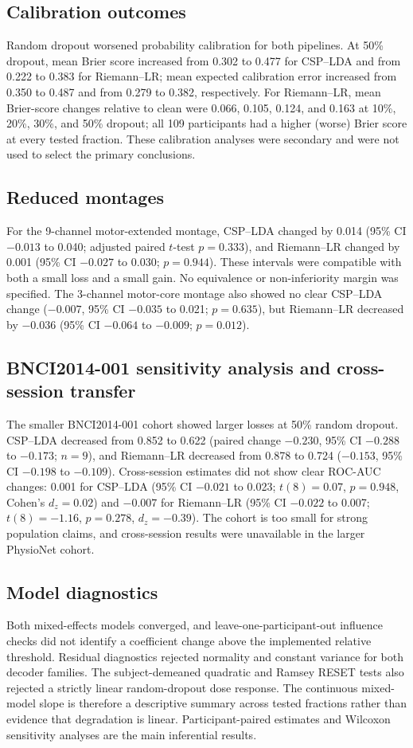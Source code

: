 \documentclass[11pt]{article}
\begin{document}
\subsection{Calibration outcomes}
Random dropout worsened probability calibration for both pipelines. At 50\% dropout, mean Brier score increased from 0.302 to 0.477 for CSP--LDA and from 0.222 to 0.383 for Riemann--LR; mean expected calibration error increased from 0.350 to 0.487 and from 0.279 to 0.382, respectively. For Riemann--LR, mean Brier-score changes relative to clean were 0.066, 0.105, 0.124, and 0.163 at 10\%, 20\%, 30\%, and 50\% dropout; all 109 participants had a higher (worse) Brier score at every tested fraction. These calibration analyses were secondary and were not used to select the primary conclusions.

\subsection{Reduced montages}
For the 9-channel motor-extended montage, CSP--LDA changed by 0.014 (95\% CI $-0.013$ to 0.040; adjusted paired $t$-test $p=0.333$), and Riemann--LR changed by 0.001 (95\% CI $-0.027$ to 0.030; $p=0.944$). These intervals were compatible with both a small loss and a small gain. No equivalence or non-inferiority margin was specified. The 3-channel motor-core montage also showed no clear CSP--LDA change ($-0.007$, 95\% CI $-0.035$ to 0.021; $p=0.635$), but Riemann--LR decreased by $-0.036$ (95\% CI $-0.064$ to $-0.009$; $p=0.012$).

\subsection{BNCI2014-001 sensitivity analysis and cross-session transfer}
The smaller BNCI2014-001 cohort showed larger losses at 50\% random dropout. CSP--LDA decreased from 0.852 to 0.622 (paired change $-0.230$, 95\% CI $-0.288$ to $-0.173$; $n=9$), and Riemann--LR decreased from 0.878 to 0.724 ($-0.153$, 95\% CI $-0.198$ to $-0.109$). Cross-session estimates did not show clear ROC-AUC changes: 0.001 for CSP--LDA (95\% CI $-0.021$ to 0.023; $t(8)=0.07$, $p=0.948$, Cohen's $d_z=0.02$) and $-0.007$ for Riemann--LR (95\% CI $-0.022$ to 0.007; $t(8)=-1.16$, $p=0.278$, $d_z=-0.39$). The cohort is too small for strong population claims, and cross-session results were unavailable in the larger PhysioNet cohort.

\subsection{Model diagnostics}
Both mixed-effects models converged, and leave-one-participant-out influence checks did not identify a coefficient change above the implemented relative threshold. Residual diagnostics rejected normality and constant variance for both decoder families. The subject-demeaned quadratic and Ramsey RESET tests also rejected a strictly linear random-dropout dose response. The continuous mixed-model slope is therefore a descriptive summary across tested fractions rather than evidence that degradation is linear. Participant-paired estimates and Wilcoxon sensitivity analyses are the main inferential results.
\end{document}
